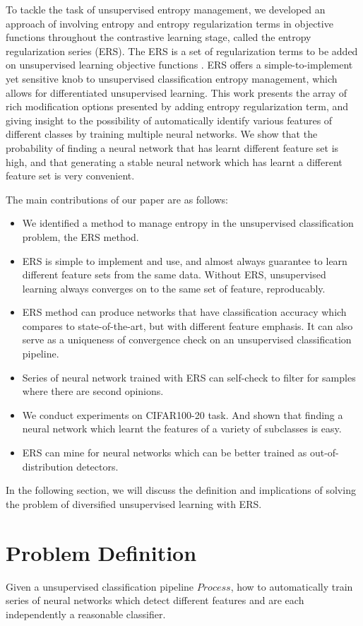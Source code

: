 \documentclass[10pt,twocolumn,letterpaper]{article}
\begin{document}
To tackle the task of unsupervised entropy management, we developed an approach of involving entropy and entropy regularization terms in objective functions throughout the contrastive learning stage, called the entropy regularization series (ERS). The ERS is a set of regularization terms to be added on unsupervised learning objective functions . ERS offers a simple-to-implement yet sensitive knob to unsupervised classification entropy management, which allows for differentiated unsupervised learning. This work presents the array of rich modification options presented by adding entropy regularization term, and giving insight to the possibility of automatically identify various features of different classes by training multiple neural networks. We show that the probability of finding a neural network that has learnt different feature set is high, and that generating a stable neural network which has learnt a different feature set is very convenient.

The main contributions of our paper are as follows:
\begin{itemize} 
\item We identified a method to manage entropy in the unsupervised classification problem, the ERS method.
\item ERS is simple to implement and use, and almost always guarantee to learn different feature sets from the same data. Without ERS, unsupervised learning always converges on to the same set of feature, reproducably. 
\item ERS method can produce networks that have classification accuracy which compares to state-of-the-art, but with different feature emphasis. It can also serve as a uniqueness of convergence check on an unsupervised classification pipeline.
\item Series of neural network trained with ERS can self-check to filter for samples where there are second opinions. 
\item We conduct experiments on CIFAR100-20 task. And shown that finding a neural network which learnt the features of a variety of subclasses is easy.
\item ERS can mine for neural networks which can be better trained as out-of-distribution detectors.
\end{itemize}

In the following section, we will discuss the definition and implications of solving the problem of diversified unsupervised learning with ERS. 

\section{Problem Definition}
Given a unsupervised classification pipeline $Process$, how to automatically train series of neural networks which detect different features and are each independently a reasonable classifier. 
\end{document}
